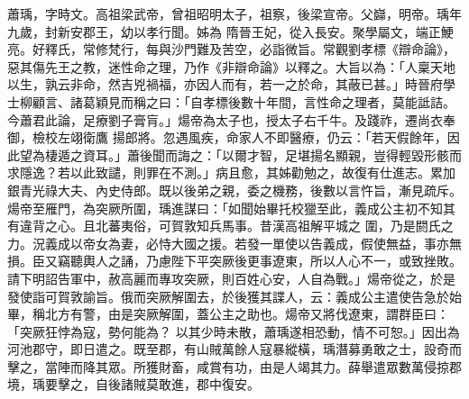 \begin{pinyinscope}
 蕭瑀，字時文。高祖梁武帝，曾祖昭明太子，祖察，後梁宣帝。父巋，明帝。瑀年九歲，封新安郡王，幼以孝行聞。姊為
 隋晉王妃，從入長安。聚學屬文，端正鯁亮。好釋氏，常修梵行，每與沙門難及苦空，必詣微旨。常觀劉孝標《辯命論》，惡其傷先王之教，迷性命之理，乃作《非辯命論》以釋之。大旨以為：「人稟天地以生，孰云非命，然吉兇禍福，亦因人而有，若一之於命，其蔽已甚。」時晉府學士柳顧言、諸葛穎見而稱之曰：「自孝標後數十年間，言性命之理者，莫能詆詰。今蕭君此論，足療劉子膏肓。」煬帝為太子也，授太子右千牛。及踐祚，遷尚衣奉御，檢校左翊衛鷹
 揚郎將。忽遇風疾，命家人不即醫療，仍云：「若天假餘年，因此望為棲遁之資耳。」蕭後聞而誨之：「以爾才智，足堪揚名顯親，豈得輕毀形骸而求隱逸？若以此致譴，則罪在不測。」病且愈，其姊勸勉之，故復有仕進志。累加銀青光祿大夫、內史侍郎。既以後弟之親，委之機務，後數以言忤旨，漸見疏斥。煬帝至雁門，為突厥所圍，瑀進謀曰：「如聞始畢托校獵至此，義成公主初不知其有違背之心。且北蕃夷俗，可賀敦知兵馬事。昔漢高祖解平城之
 圍，乃是閼氏之力。況義成以帝女為妻，必恃大國之援。若發一單使以告義成，假使無益，事亦無損。臣又竊聽輿人之誦，乃慮陛下平突厥後更事遼東，所以人心不一，或致挫敗。請下明詔告軍中，赦高麗而專攻突厥，則百姓心安，人自為戰。」煬帝從之，於是發使詣可賀敦諭旨。俄而突厥解圍去，於後獲其諜人，云：義成公主遣使告急於始畢，稱北方有警，由是突厥解圍，蓋公主之助也。煬帝又將伐遼東，謂群臣曰：「突厥狂悖為寇，勢何能為？
 以其少時未散，蕭瑀遂相恐動，情不可恕。」因出為河池郡守，即日遣之。既至郡，有山賊萬餘人寇暴縱橫，瑀潛募勇敢之士，設奇而擊之，當陣而降其眾。所獲財畜，咸賞有功，由是人竭其力。薛舉遣眾數萬侵掠郡境，瑀要擊之，自後諸賊莫敢進，郡中復安。




\end{pinyinscope}
